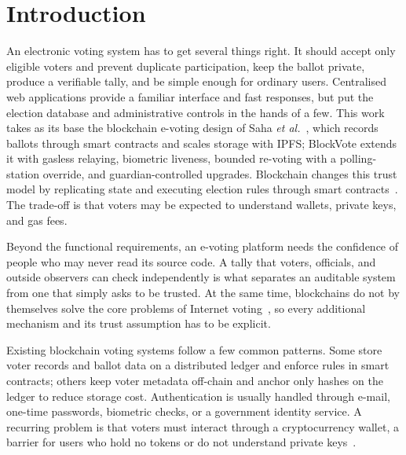 \documentclass[conference]{IEEEtran}
\begin{document}
\section{Introduction}
An electronic voting system has to get several things right. It should accept only eligible voters and prevent duplicate participation, keep the ballot private, produce a verifiable tally, and be simple enough for ordinary users. Centralised web applications provide a familiar interface and fast responses, but put the election database and administrative controls in the hands of a few. This work takes as its base the blockchain e-voting design of Saha \emph{et al.}~\cite{saha2025}, which records ballots through smart contracts and scales storage with IPFS; BlockVote extends it with gasless relaying, biometric liveness, bounded re-voting with a polling-station override, and guardian-controlled upgrades. Blockchain changes this trust model by replicating state and executing election rules through smart contracts~\cite{nakamoto2008,wood2014}. The trade-off is that voters may be expected to understand wallets, private keys, and gas fees.

Beyond the functional requirements, an e-voting platform needs the confidence of people who may never read its source code. A tally that voters, officials, and outside observers can check independently is what separates an auditable system from one that simply asks to be trusted. At the same time, blockchains do not by themselves solve the core problems of Internet voting~\cite{park2021}, so every additional mechanism and its trust assumption has to be explicit.

Existing blockchain voting systems follow a few common patterns. Some store voter records and ballot data on a distributed ledger and enforce rules in smart contracts; others keep voter metadata off-chain and anchor only hashes on the ledger to reduce storage cost. Authentication is usually handled through e-mail, one-time passwords, biometric checks, or a government identity service. A recurring problem is that voters must interact through a cryptocurrency wallet, a barrier for users who hold no tokens or do not understand private keys~\cite{saha2025,abdulah2023,gnanapriya2023}.
\end{document}
